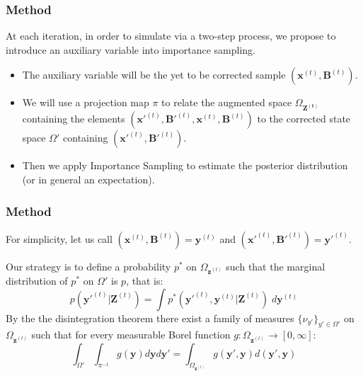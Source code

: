 \documentclass[9pt]{beamer}
\begin{document}
\begin{frame}
\frametitle{Method}
At each iteration, in order to simulate via a two-step process, we propose to introduce an auxiliary variable into importance sampling.
\begin{itemize}
\setlength\itemsep{2em}
\item The auxiliary variable will be the yet to be corrected sample
 $(\bm{x}^{(t)}, \bm{B}^{(t)})$.
\item We will use a projection map $\pi$ to relate the augmented space $\Omega_{\bm{Z^{(t)}}}$ containing the elements  $(\bm{x'}^{(t)}, \bm{B'}^{(t)}, \bm{x}^{(t)}, \bm{B}^{(t)})$ to the corrected state space $\Omega'$ containing $(\bm{x'}^{(t)}, \bm{B'}^{(t)})$.
\item Then we apply Importance Sampling to estimate the posterior distribution (or in general an expectation).
\end{itemize}
\end{frame}

\begin{frame}
\frametitle{Method}
For simplicity, let us call $(\bm{x}^{(t)}, \bm{B}^{(t)}) = \bm{y}^{(t)}$ and $(\bm{x'}^{(t)}, \bm{B'}^{(t)}) = \bm{y'}^{(t)}$.

Our strategy is to define a probability $p^*$ on $\Omega_{\bm{z}^{(t)}}$ such that the marginal distribution of $p^*$ on $\Omega'$ is $p$, that is:
\[
p(\bm{y'}^{(t)} | \bm{Z}^{(t)}) = \int p^*(\bm{y'}^{(t)}, \bm{y}^{(t)} | \bm{Z}^{(t)})\; d \bm{y}^{(t)}
\]
By the the disintegration theorem there exist a family of measures $\{\nu_{y'}\}_{y' \in \Omega'}$ on $\Omega_{\bm{z}^{(t)}}$ such that for every measurable Borel function $g : \Omega_{\bm{z}^{(t)}} \rightarrow [0,\infty]$:
\[
\int_{\Omega'}\int_{\pi^{-1}} g(\bm{y}) d\bm{y} d\bm{\bm{y'}} = \int_{\Omega_{\bm{z}^{(t)}}} g(\bm{y}', \bm{y}) d(\bm{y'},\bm{y})
\]
\end{frame}
\end{document}
